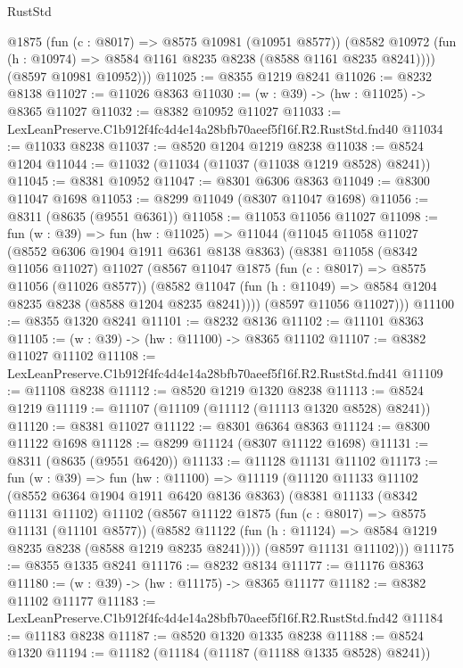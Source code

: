 \begin{lexlean}{RustStd}
\begin{coremodule}
          @1875
          (fun (c : @8017) => @8575 @10981 (@10951 @8577))
          (@8582 @10972 (fun (h : @10974) => @8584 @1161 @8235 @8238 (@8588 @1161 @8235 @8241))))
        (@8597 @10981 @10952)))
@11025 := @8355 @1219 @8241
@11026 := @8232 @8138
@11027 := @11026 @8363
@11030 := (w : @39) -> (hw : @11025) -> @8365 @11027
@11032 := @8382 @10952 @11027
@11033 := LexLeanPreserve.C1b912f4fc4d4e14a28bfb70aeef5f16f.R2.RustStd.fnd40
@11034 := @11033 @8238
@11037 := @8520 @1204 @1219 @8238
@11038 := @8524 @1204
@11044 := @11032 (@11034 (@11037 (@11038 @1219 @8528) @8241))
@11045 := @8381 @10952
@11047 := @8301 @6306 @8363
@11049 := @8300 @11047 @1698
@11053 := @8299 @11049 (@8307 @11047 @1698)
@11056 := @8311 (@8635 (@9551 @6361))
@11058 := @11053 @11056 @11027
@11098 := fun (w : @39) =>
  fun (hw : @11025) =>
  @11044
    (@11045
      @11058
      @11027
      (@8552 @6306 @1904 @1911 @6361 @8138 @8363)
      (@8381
        @11058
        (@8342 @11056 @11027)
        @11027
        (@8567
          @11047
          @1875
          (fun (c : @8017) => @8575 @11056 (@11026 @8577))
          (@8582 @11047 (fun (h : @11049) => @8584 @1204 @8235 @8238 (@8588 @1204 @8235 @8241))))
        (@8597 @11056 @11027)))
@11100 := @8355 @1320 @8241
@11101 := @8232 @8136
@11102 := @11101 @8363
@11105 := (w : @39) -> (hw : @11100) -> @8365 @11102
@11107 := @8382 @11027 @11102
@11108 := LexLeanPreserve.C1b912f4fc4d4e14a28bfb70aeef5f16f.R2.RustStd.fnd41
@11109 := @11108 @8238
@11112 := @8520 @1219 @1320 @8238
@11113 := @8524 @1219
@11119 := @11107 (@11109 (@11112 (@11113 @1320 @8528) @8241))
@11120 := @8381 @11027
@11122 := @8301 @6364 @8363
@11124 := @8300 @11122 @1698
@11128 := @8299 @11124 (@8307 @11122 @1698)
@11131 := @8311 (@8635 (@9551 @6420))
@11133 := @11128 @11131 @11102
@11173 := fun (w : @39) =>
  fun (hw : @11100) =>
  @11119
    (@11120
      @11133
      @11102
      (@8552 @6364 @1904 @1911 @6420 @8136 @8363)
      (@8381
        @11133
        (@8342 @11131 @11102)
        @11102
        (@8567
          @11122
          @1875
          (fun (c : @8017) => @8575 @11131 (@11101 @8577))
          (@8582 @11122 (fun (h : @11124) => @8584 @1219 @8235 @8238 (@8588 @1219 @8235 @8241))))
        (@8597 @11131 @11102)))
@11175 := @8355 @1335 @8241
@11176 := @8232 @8134
@11177 := @11176 @8363
@11180 := (w : @39) -> (hw : @11175) -> @8365 @11177
@11182 := @8382 @11102 @11177
@11183 := LexLeanPreserve.C1b912f4fc4d4e14a28bfb70aeef5f16f.R2.RustStd.fnd42
@11184 := @11183 @8238
@11187 := @8520 @1320 @1335 @8238
@11188 := @8524 @1320
@11194 := @11182 (@11184 (@11187 (@11188 @1335 @8528) @8241))

\end{coremodule}
\end{lexlean}
